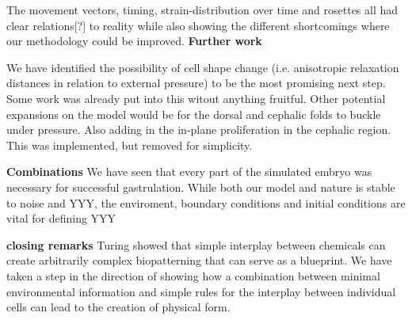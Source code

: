 The movement vectors, timing, strain-distribution over time and rosettes all had clear relations[?] to reality while also showing the different shortcomings where our methodology could be improved.
\textbf{Further work}

We have identified the possibility of cell shape change (i.e. anisotropic relaxation distances in relation to external pressure) to be the most promising next step. Some work was already put into this witout anything fruitful. Other potential expansions on the model would be for the dorsal and cephalic folds to buckle under pressure. Also adding in the in-plane proliferation in the cephalic region. This was implemented, but removed for simplicity.

\textbf{Combinations}
We have seen that every part of the simulated embryo was necessary for successful gastrulation. 
While both our model and nature is stable to noise and YYY, the enviroment, boundary conditions and initial conditions are vital for defining YYY

\textbf{closing remarks}
Turing showed that simple interplay between chemicals can create arbitrarily complex biopatterning that can serve as a blueprint. We have taken a step in the direction of showing how a combination between minimal environmental information and simple rules for the interplay between individual cells can lead to the creation of physical form. 
